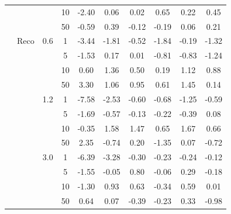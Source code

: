 \documentclass[conference]{IEEEtran}
\begin{document}
\begin{table}[htbp]
\begin{minipage}{\linewidth}
\begin{center}
{\begin{tabular}{|c|c|c|c|c|c|c|c|c|c|}
                    \cline{4-10} &               &              & 10          & -2.40      & 0.06       & 0.02       & 0.65       & 0.22       & 0.45       \\
                    \cline{4-10} &               &              & 50          & -0.59      & 0.39       & -0.12      & -0.19      & 0.06       & 0.21       \\
                    \cline{2-10} & Reco          & 0.6          & 1           & -3.44      & -1.81      & -0.52      & -1.84      & -0.19      & -1.32      \\
                    \cline{4-10} &               &              & 5           & -1.53      & 0.17       & 0.01       & -0.81      & -0.83      & -1.24      \\
                    \cline{4-10} &               &              & 10          & 0.60       & 1.36       & 0.50       & 0.19       & 1.12       & 0.88       \\
                    \cline{4-10} &               &              & 50          & 3.30       & 1.06       & 0.95       & 0.61       & 1.45       & 0.14       \\
                    \cline{3-10} &               & 1.2          & 1           & -7.58      & -2.53      & -0.60      & -0.68      & -1.25      & -0.59      \\
                    \cline{4-10} &               &              & 5           & -1.69      & -0.57      & -0.13      & -0.22      & -0.39      & 0.08       \\
                    \cline{4-10} &               &              & 10          & -0.35      & 1.58       & 1.47       & 0.65       & 1.67       & 0.66       \\
                    \cline{4-10} &               &              & 50          & 2.35       & -0.74      & 0.20       & -1.35      & 0.07       & -0.72      \\
                    \cline{3-10} &               & 3.0          & 1           & -6.39      & -3.28      & -0.30      & -0.23      & -0.24      & -0.12      \\
                    \cline{4-10} &               &              & 5           & -1.55      & -0.05      & 0.80       & -0.06      & 0.29       & -0.18      \\
                    \cline{4-10} &               &              & 10          & -1.30      & 0.93       & 0.63       & -0.34      & 0.59       & 0.01       \\
                    \cline{4-10} &               &              & 50          & 0.64       & 0.07       & -0.39      & -0.23      & 0.33       & -0.98      \\

\end{tabular}}
\end{center}
\end{minipage}
\end{table}
\end{document}
